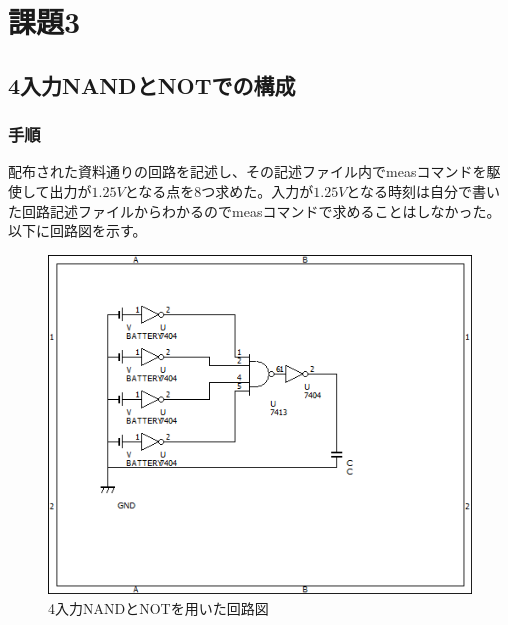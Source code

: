 \documentclass{jsarticle}
\begin{document}
\section{課題3}


\subsection{4入力NANDとNOTでの構成}
\subsubsection{手順}
配布された資料通りの回路を記述し、その記述ファイル内でmeasコマンドを駆使して出力が$1.25V$となる点を8つ求めた。入力が$1.25V$となる時刻は自分で書いた回路記述ファイルからわかるのでmeasコマンドで求めることはしなかった。
以下に回路図を示す。
\begin{figure}[H]
    \centering
    \includegraphics[bb=0 0 500 400]{ex3_nand_not.png}
    \caption{4入力NANDとNOTを用いた回路図}
\end{figure}
\end{document}
